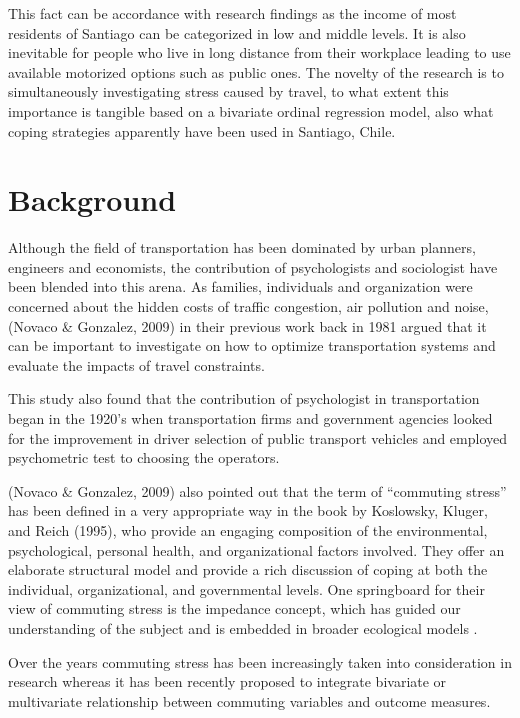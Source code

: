 \documentclass[
11pt, %
oneside, %
english, %
singlespacing, %
]{macthesis} %
\begin{document}
This fact can be accordance with research findings as the income of most residents of Santiago can be categorized in low and middle levels. It is also inevitable for people who live in long distance from their workplace leading to use available motorized options such as public ones. The novelty of the research is to simultaneously investigating stress caused by travel, to what extent this importance is tangible based on a bivariate ordinal regression model, also what coping strategies apparently have been used in Santiago, Chile.

\hypertarget{background}{%
\section{Background}\label{background}}

Although the field of transportation has been dominated by urban planners, engineers and economists, the contribution of psychologists and sociologist have been blended into this arena. As families, individuals and organization were concerned about the hidden costs of traffic congestion, air pollution and noise, (Novaco \& Gonzalez, 2009) in their previous work back in 1981 argued that it can be important to investigate on how to optimize transportation systems and evaluate the impacts of travel constraints.

This study also found that the contribution of psychologist in transportation began in the 1920's when transportation firms and government agencies looked for the improvement in driver selection of public transport vehicles and employed psychometric test to choosing the operators.

(Novaco \& Gonzalez, 2009) also pointed out that the term of ``commuting stress'' has been defined in a very appropriate way in the book by Koslowsky, Kluger, and Reich (1995), who provide an engaging composition of the environmental, psychological, personal health, and organizational factors involved. They offer an elaborate structural model and provide a rich discussion of coping at both the individual, organizational, and governmental levels. One springboard for their view of commuting stress is the impedance concept, which has guided our understanding of the subject and is embedded in broader ecological models .

Over the years commuting stress has been increasingly taken into consideration in research whereas it has been recently proposed to integrate bivariate or multivariate relationship between commuting variables and outcome measures.
\end{document}
